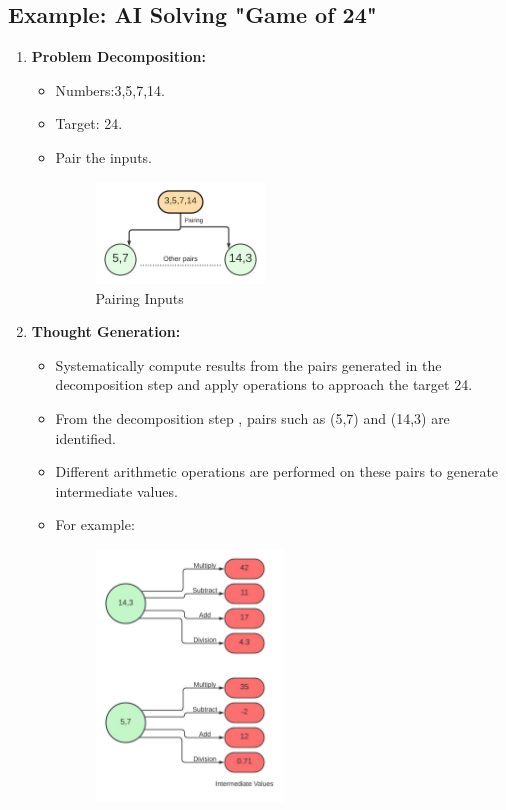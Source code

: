 \documentclass[12pt, a4paper]{article}
\begin{document}
\subsection{Example: AI Solving "Game of 24"}
\begin{enumerate}
    \item \textbf{Problem Decomposition:}
    \begin{itemize}
        \item Numbers:3,5,7,14.
        \item Target: 24.
        \item Pair the inputs.
        \begin{figure}[H]
    \centering
    \includegraphics[width=0.45\textwidth,height=0.35\textwidth]{Org chart.jpeg}
    \caption{Pairing Inputs}
    \label{fig:Pairing Inputs.}
\end{figure}
    \end{itemize}
    \item \textbf{Thought Generation:}
    \begin{itemize}
        \item Systematically compute results from the pairs generated in the decomposition
  step and apply operations to approach the target 24.
  \item From the decomposition step , pairs such as (5,7) and (14,3) are identified.
  \item Different arithmetic operations are performed on these pairs to generate intermediate values.
  \item For example:
   \begin{figure}[H]
    \centering
    \includegraphics[width=0.5\textwidth,height=0.5\textwidth]{Org chart (1).jpeg}

\end{figure}
\end{itemize}
\end{enumerate}
\end{document}

